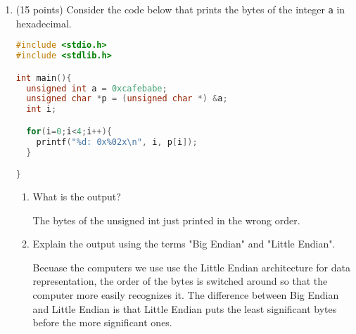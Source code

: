 \documentclass{article}[9pt]
\newenvironment{answerfont}{\fontfamily{qhv}\selectfont}{\par}
\newenvironment{myanswer}{\begin{mdframed}\begin{answerfont}}{\end{answerfont}\end{mdframed}}
\begin{document}
\begin{enumerate}
\begin{lstlisting}[language=c]
  mytypes = allocate(10);


  for(i=0;i<10;i++){
    printf("mytpyes[%d] = [",i);
    for(j=0;j<mytypes[i]->size;j++){
      printf(" %d", mytypes[i]->a[j]);
    }
    printf(" ]\n");
  }

  deallocate(mytypes);
}
\end{lstlisting}

\begin{myanswer}
\begin{lstlisting}[language=c]
void deallocate(mytype_t ** mytypes)
{

  int i,j;
  for(i=0;i<10;i++){
    free(mytypes[i]->a);
    free(mytypes[i]);
    }
  free(mytypes);
}
\end{lstlisting}
\end{myanswer}


\item (15 points) Consider the code below that prints the bytes of the integer \texttt{a}
in hexadecimal.

\begin{lstlisting}[language=c]
#include <stdio.h>
#include <stdlib.h>

int main(){
  unsigned int a = 0xcafebabe;
  unsigned char *p = (unsigned char *) &a;
  int i;

  for(i=0;i<4;i++){
    printf("%d: 0x%02x\n", i, p[i]);
  }

}
\end{lstlisting}


\begin{enumerate}
\item What is the output?

\begin{myanswer}
The bytes of the unsigned int just printed in the wrong order.
\end{myanswer}

\item Explain the output using the terms "Big Endian" and "Little Endian".

\begin{myanswer}
Becuase the computers we use use the Little Endian architecture for data representation, the order of the bytes is switched around
so that the computer more easily recognizes it. The difference between Big Endian and Little Endian is that Little Endian puts the least
significant bytes before the more significant ones.
\end{myanswer}

\end{enumerate}
\end{enumerate}
\end{document}
